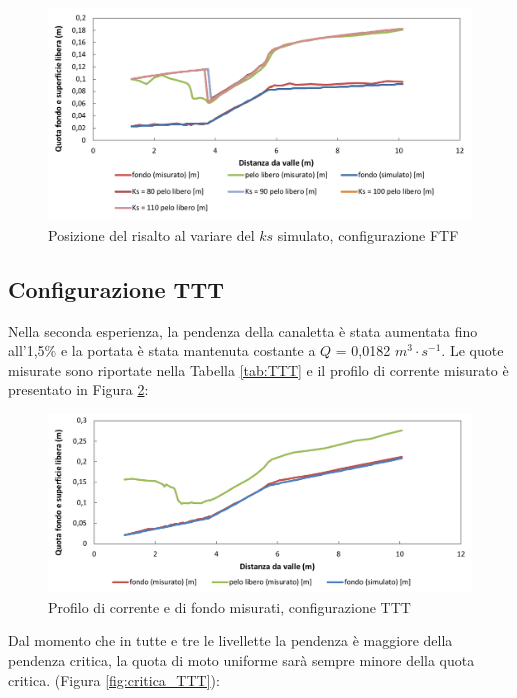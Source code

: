 \documentclass[12pt]{article} %
\begin{document}
\begin{figure}[H]
    \centering
    \includegraphics[width=\textwidth]{FTFrisalto5.5.png}
    \caption{Posizione del risalto al variare del $ks$ simulato, configurazione FTF}
    \label{fig:risalto_FTF}
\end{figure}

\newpage

\subsection{Configurazione TTT}

\noindent Nella seconda esperienza, la pendenza della canaletta è stata aumentata fino all’1,5\% e la portata è stata mantenuta costante a $Q$ = 0,0182 $m^3\cdot s^{-1}$. 
Le quote misurate sono riportate nella Tabella \ref{tab:TTT} e il profilo di corrente misurato è presentato in Figura \ref{fig:profilo_TTT}:

\begin{figure}[H]
    \centering
    \includegraphics[width=\textwidth]{TTTbase.png}
    \caption{Profilo di corrente e di fondo misurati, configurazione TTT}
    \label{fig:profilo_TTT}
\end{figure}

\noindent Dal momento che in tutte e tre le livellette la pendenza è maggiore della pendenza critica, la quota di moto uniforme sarà sempre minore della quota critica. (Figura \ref{fig:critica_TTT}): 
\end{document}

